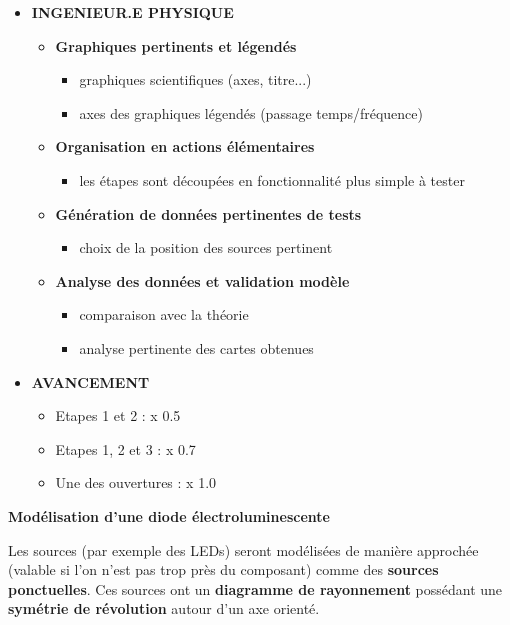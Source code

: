 \documentclass[10pt]{article} %
\begin{document}
\begin{itemize}
	\item \textbf{INGENIEUR.E PHYSIQUE}
	\begin{itemize}
		\item \textbf{Graphiques pertinents et légendés}
		\begin{itemize}
			\item graphiques scientifiques (axes, titre...)
			\item axes des graphiques légendés (passage temps/fréquence)
		\end{itemize}		 
		\item \textbf{Organisation en actions élémentaires}
		\begin{itemize}
			\item les étapes sont découpées en fonctionnalité plus simple à tester
		\end{itemize}
		\item \textbf{Génération de données pertinentes de tests}
		\begin{itemize}
			\item choix de la position des sources pertinent
		\end{itemize}
		\item \textbf{Analyse des données et validation modèle}
		\begin{itemize}
			\item comparaison avec la théorie
			\item analyse pertinente des cartes obtenues
		\end{itemize}
	\end{itemize}
	
\medskip	
	
	\item \textbf{AVANCEMENT}
	\begin{itemize}
		\item Etapes 1 et 2 : x 0.5
		\item Etapes 1, 2 et 3 : x 0.7
		\item Une des ouvertures : x 1.0
	\end{itemize}
\end{itemize}



\newpage

\hypertarget{stepbystep}{}

\textbf{Modélisation d'une diode électroluminescente}

Les sources (par exemple des LEDs) seront modélisées de manière approchée (valable si l'on n'est pas trop près du composant) comme des \textbf{sources ponctuelles}. Ces sources ont un \textbf{diagramme de rayonnement} possédant une \textbf{symétrie de révolution} autour d'un axe orienté. 
\end{document}
